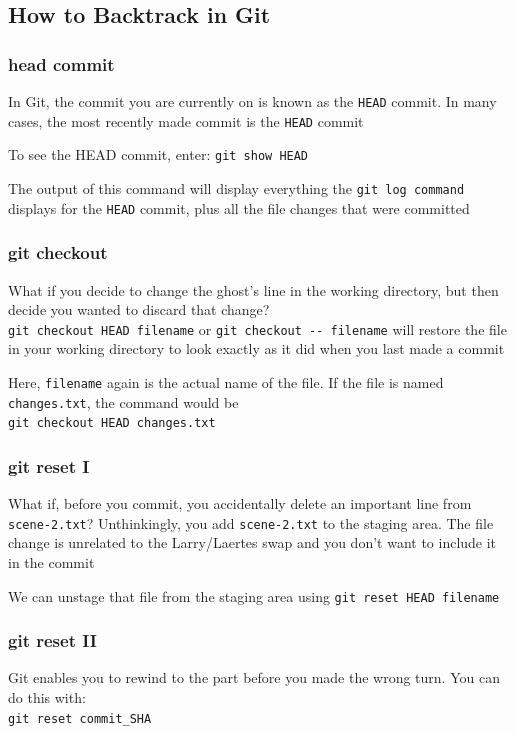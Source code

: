 \documentclass[a4paper, 12pt]{article}
\begin{document}
\subsection{How to Backtrack in Git}
\subsubsection{head commit}
In Git, the commit you are currently on is known as the \verb|HEAD| commit. In many cases, the most recently made commit is the \verb|HEAD| commit

To see the HEAD commit, enter: \verb|git show HEAD|

The output of this command will display everything the \verb|git log command| displays for the \verb|HEAD| commit, plus all the file changes that were committed

\subsubsection{git checkout}
What if you decide to change the ghost's line in the working directory, but then decide you wanted to discard that change?\\
\verb|git checkout HEAD filename| or \verb|git checkout -- filename| will restore the file in your working directory to look exactly as it did when you last made a commit

Here, \verb|filename| again is the actual name of the file. If the file is named \verb|changes.txt|, the command would be\\
\verb|git checkout HEAD changes.txt|


\subsubsection{git reset I}

What if, before you commit, you accidentally delete an important line from \verb|scene-2.txt|? Unthinkingly, you add \verb|scene-2.txt| to the staging area. The file change is unrelated to the Larry/Laertes swap and you don't want to include it in the commit

We can unstage that file from the staging area using \verb|git reset HEAD filename|

\subsubsection{git reset II}
Git enables you to rewind to the part before you made the wrong turn. You can do this with:\\ 
\verb|git reset commit_SHA|
\end{document}
